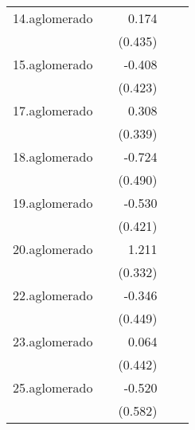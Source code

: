 {\begin{longtable}{l*{4}{D{.}{.}{-1}}}
\addlinespace
14.aglomerado&                     &       0.174         &                     &                     \\
            &                     &     (0.435)         &                     &                     \\
\addlinespace
15.aglomerado&                     &      -0.408         &                     &                     \\
            &                     &     (0.423)         &                     &                     \\
\addlinespace
17.aglomerado&                     &       0.308         &                     &                     \\
            &                     &     (0.339)         &                     &                     \\
\addlinespace
18.aglomerado&                     &      -0.724         &                     &                     \\
            &                     &     (0.490)         &                     &                     \\
\addlinespace
19.aglomerado&                     &      -0.530         &                     &                     \\
            &                     &     (0.421)         &                     &                     \\
\addlinespace
20.aglomerado&                     &       1.211\sym{***}&                     &                     \\
            &                     &     (0.332)         &                     &                     \\
\addlinespace
22.aglomerado&                     &      -0.346         &                     &                     \\
            &                     &     (0.449)         &                     &                     \\
\addlinespace
23.aglomerado&                     &       0.064         &                     &                     \\
            &                     &     (0.442)         &                     &                     \\
\addlinespace
25.aglomerado&                     &      -0.520         &                     &                     \\
            &                     &     (0.582)         &                     &                     \\

\end{longtable}}
